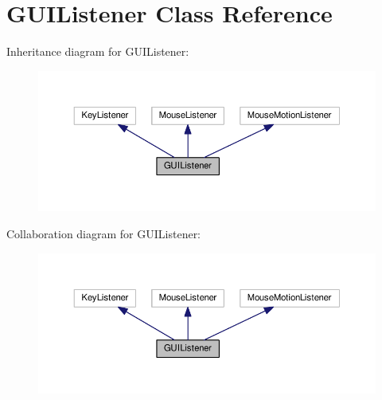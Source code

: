 \hypertarget{classGUIListener}{}\section{G\+U\+I\+Listener Class Reference}
\label{classGUIListener}


Inheritance diagram for G\+U\+I\+Listener\+:
\nopagebreak
\begin{figure}[H]
\begin{center}
\leavevmode
\includegraphics[width=350pt]{classGUIListener__inherit__graph}
\end{center}
\end{figure}


Collaboration diagram for G\+U\+I\+Listener\+:
\nopagebreak
\begin{figure}[H]
\begin{center}
\leavevmode
\includegraphics[width=350pt]{classGUIListener__coll__graph}
\end{center}
\end{figure}
